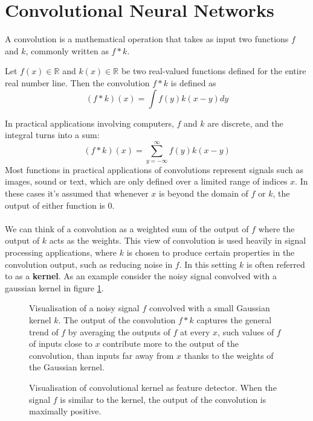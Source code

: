 \section{Convolutional Neural Networks}
A convolution is a mathematical operation that takes as input two functions $f$ and $k$, commonly written as $f * k$.

\begin{definition}[convolution] \label{convolution}
	Let $f(x) \in \mathbb{R}$ and $k(x) \in \mathbb{R}$ be two real-valued functions defined for the entire real number line. Then the convolution $f * k$ is defined as
	$$
		(f * k)(x) = \int f(y)k(x - y)dy
	$$
\end{definition}

In practical applications involving computers, $f$ and $k$ are discrete, and the integral turns into a sum:
$$
(f * k)(x) = \sum\limits_{y=-\infty}^\infty f(y)k(x - y)
$$
Most functions in practical applications of convolutions represent signals such as images, sound or text, which are only defined over a limited range of indices $x$. In these cases it's assumed that whenever $x$ is beyond the domain of $f$ or $k$, the output of either function is 0.
\\\\
We can think of a convolution as a weighted sum of the output of $f$ where the output of $k$ acts as the weights. This view of convolution is used heavily in signal processing applications, where $k$ is chosen to produce certain properties in the convolution output, such as reducing noise in $f$. In this setting $k$ is often referred to as a \textbf{kernel}. As an example consider the noisy signal convolved with a gaussian kernel in figure \ref{gaussian_convolution}.

\begin{figure}
	\centering
	
	\caption{Visualisation of a noisy signal $f$ convolved with a small Gaussian kernel $k$. The output of the convolution $f * k$ captures the general trend of $f$ by averaging the outputs of $f$ at every $x$, such values of $f$ of inputs close to $x$ contribute more to the output of the convolution, than inputs far away from $x$ thanks to the weights of the Gaussian kernel.}
	\label{gaussian_convolution}
\end{figure}

\begin{figure}
	\centering
	
	\caption{Visualisation of convolutional kernel as feature detector. When the signal $f$ is similar to the kernel, the output of the convolution is maximally positive.}
	\label{feature_detector}
\end{figure}

